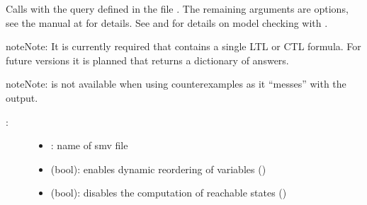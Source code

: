 \documentclass[letterpaper,10pt,english]{sphinxmanual}
\begin{document}
\begin{fulllineitems}
\label{\detokenize{ModelChecking:PyBoolNet.ModelChecking.check_smv_with_counterexample}}
Calls {\hyperref[\detokenize{Installation:installation-nusmv}]{}} with the query defined in the  file .
The remaining arguments are {\hyperref[\detokenize{Installation:installation-nusmv}]{}} options, see the manual at  for details.
See {\hyperref[\detokenize{ModelChecking:primes2smv}]{}} and {\hyperref[\detokenize{Manual:sec-model-checking}]{}} for details on model checking with .

\begin{sphinxadmonition}{note}{Note:}
It is currently required that  contains a single LTL or CTL formula.
For future versions it is planned that {\hyperref[\detokenize{ModelChecking:check-smv}]{}} returns a dictionary of answers.
\end{sphinxadmonition}

\begin{sphinxadmonition}{note}{Note:}
 is not available when using counterexamples as it “messes” with the output.
\end{sphinxadmonition}
\begin{description}
\item[{:}] \leavevmode\begin{itemize}
\item {} 
: name of smv file

\item {} 
 (bool): enables dynamic reordering of variables ()

\item {} 
 (bool): disables the computation of reachable states ()

\end{itemize}


\end{description}
\end{fulllineitems}
\end{document}
